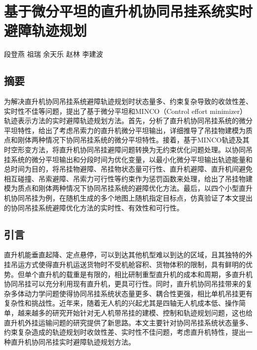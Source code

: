 \chapter{基于微分平坦的直升机协同吊挂系统实时避障轨迹规划}
段登燕  祖瑞  余天乐  赵林  李建波
\section{摘要}
为解决直升机协同吊挂系统避障轨迹规划时状态量多、约束复杂导致的收敛性差、实时性不佳等问题，提出了基于微分平坦和MINCO（Control effort minimizer）轨迹表示方法的实时避障轨迹规划方法。首先，分析了直升机协同吊挂系统的微分平坦特性，给出了考虑吊索力的直升机微分平坦输出，详细推导了吊挂物建模为质点和刚体两种情况下协同吊挂系统的微分平坦特性。接着，基于MINCO轨迹及其时空形变方法，将直升机协同吊挂避障问题转换为无约束优化问题处理。以协同吊挂系统的微分平坦输出和分段时间为优化变量，以最小化微分平坦输出轨迹能量和总时间为目的，将吊挂物避障、吊挂物状态量可行性、直升机避障、直升机间避免相互碰撞、吊索避障、吊索力可行性等约束作为惩罚函数来处理，给出了吊挂物建模为质点和刚体两种情况下协同吊挂系统的避障优化方法。最后，以四个小型直升机协同吊挂为例，在随机生成的多个地图上随机指定目标点，仿真验证了本文提出的协同吊挂系统避障优化方法的实时性、有效性和可行性。

\section{引言}

直升机能垂直起降、定点悬停，可以到达其他机型难以到达的区域，且其独特的外挂吊运方式使得直升机运送货物时不受机舱容积、货物体积的限制，具有鲜明的优势。但单个直升机的载重是有限的，相比研制重型直升机的成本和周期，多直升机协同吊挂可以充分利用现有直升机，更具可行性\cite{meier1988efficient,curtiss1985stability, bernard2011autonomous}。同时，直升机协同吊挂带来的复杂多体动力学问题使得协同吊挂系统状态量更多、耦合性更强，相比单机吊挂更有复杂性和挑战性\cite{li2014coordinated, enciu2017flight, berrios2019flight, duan2022optimal}。近年来，随着无人机的兴起尤其是四轴无人机成本低、操作简单，越来越多的研究开始针对无人机带吊挂的建模、控制和轨迹规划问题\cite{gassner2017dynamic, geng2020control, jin2022adaptive}，这也给直升机外挂运输问题的研究提供了新思路。本文主要针对协同吊挂系统状态量多、约束复杂造成的轨迹规划时收敛性差、实时性不佳问题，考虑直升机特性，提出一种直升机协同吊挂实时避障轨迹规划方法。

